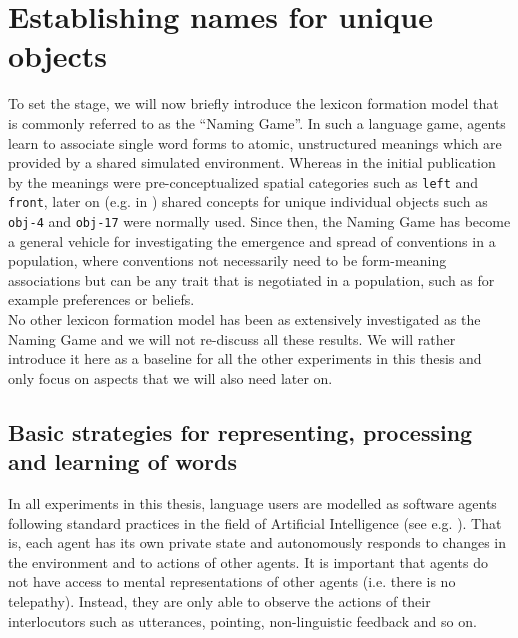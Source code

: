 
\setcounter{chapter}{3}

\chapter{Establishing names for unique objects}
\label{c:naming-game}

To set the stage, we will now briefly introduce the lexicon formation
model that is commonly referred to as the ``Naming Game''. In such a
language game, agents learn to associate single word forms to atomic,
unstructured meanings which are provided by a shared simulated
environment. Whereas in the initial publication by
\cite{steels95selforganizing} the meanings were pre-conceptualized
spatial categories such as \texttt{left} and \texttt{front}, later on
(e.g. in \citealp{steels99spatially}) shared concepts for unique
individual objects such as \texttt{obj-4} and \texttt{obj-17} were
normally used. Since then, the Naming Game has become a general
vehicle for investigating the emergence and spread of conventions in a
population, where conventions not necessarily need to be form-meaning
associations but can be any trait that is negotiated in a population,
such as for example preferences or beliefs.\\

\noindent No other lexicon formation model has been as extensively
investigated as the Naming Game and we will not re-discuss all these
results. We will rather introduce it here as a baseline for all the
other experiments in this thesis and only focus on aspects that we
will also need later on. 


\section{Basic strategies for representing, processing and
  learning of words}
\label{s:ng-strategies}

In all experiments in this thesis, language users are modelled as
software agents following standard practices in the field of
Artificial Intelligence (see
e.g. \citealp{wooldridge95intelligent}). That is, each agent has its
own private state and autonomously responds to changes in the
environment and to actions of other agents. It is important that
agents do not have access to mental representations of other agents
(i.e. there is no telepathy). Instead, they are only able to observe
the actions of their interlocutors such as utterances, pointing,
non-linguistic feedback and so on.

